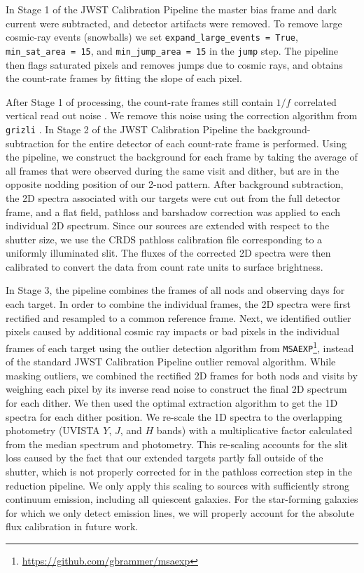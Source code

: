 \documentclass[twocolumn, astrosymb]{aastex631}
\begin{document}
In Stage 1 of the JWST Calibration Pipeline the master bias frame and dark current were subtracted, and detector artifacts were removed. To remove large cosmic-ray events (snowballs) we set \texttt{expand\_large\_events = True}, \texttt{min\_sat\_area = 15}, and \texttt{min\_jump\_area = 15} in the \texttt{jump} step. The pipeline then flags saturated pixels and removes jumps due to cosmic rays, and obtains the count-rate frames by fitting the slope of each pixel.

After Stage 1 of processing, the count-rate frames still contain $1/f$ correlated vertical read out noise \citep{ESchlawin_2020}. We remove this noise using the correction algorithm from \texttt{grizli} \citep{grizli}.
In Stage 2 of the JWST Calibration Pipeline the background-subtraction for the entire detector of each count-rate frame is performed. Using the pipeline, we construct the background for each frame by taking the average of all frames that were observed during the same visit and dither, but are in the opposite nodding position of our 2-nod pattern.
After background subtraction, the 2D spectra associated with our targets were cut out from the full detector frame, and a flat field, pathloss and barshadow correction was applied to each individual 2D spectrum. Since our sources are extended with respect to the shutter size, we use the CRDS pathloss calibration file corresponding to a uniformly illuminated slit. The fluxes of the corrected 2D spectra were then calibrated to convert the data from count rate units to surface brightness.

In Stage 3, the pipeline combines the frames of all nods and observing days for each target. In order to combine the individual frames, the 2D spectra were first rectified and resampled to a common reference frame.
Next, we identified outlier pixels caused by additional cosmic ray impacts or bad pixels in the individual frames of each target using the outlier detection algorithm from \texttt{MSAEXP}\footnote{\url{https://github.com/gbrammer/msaexp}}, instead of the standard JWST Calibration Pipeline outlier removal algorithm. While masking outliers, we combined the rectified 2D frames for both nods and visits by weighing each pixel by its inverse read noise to construct the final 2D spectrum for each dither. We then used the \citet{KHorne1986} optimal extraction algorithm to get the 1D spectra for each dither position.
We re-scale the 1D spectra to the overlapping photometry (UVISTA $Y$, $J$, and $H$ bands) with a multiplicative factor calculated from the median spectrum and photometry. This re-scaling accounts for the slit loss caused by the fact that our extended targets partly fall outside of the shutter, which is not properly corrected for in the pathloss correction step in the reduction pipeline. 
We only apply this scaling to sources with sufficiently strong continuum emission, including all quiescent galaxies. For the star-forming galaxies for which we only detect emission lines, we will properly account for the absolute flux calibration in future work.
\end{document}
